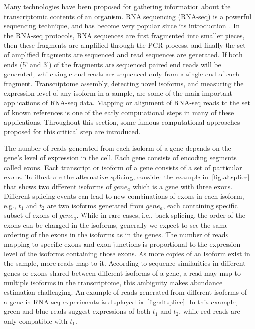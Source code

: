 Many technologies have been proposed for gathering information about 
the transcriptomic contents of an organism. RNA sequencing (RNA-seq) is a 
powerful sequencing technique, and has become very popular since its 
introduction~\citep{mortazavi}. In the RNA-seq protocols, RNA sequences are 
first fragmented into smaller pieces, then these fragments are amplified 
through the PCR process, and finally the set of amplified fragments are 
sequenced and read sequences are generated. If both ends (5' and 3') of the 
fragments are sequenced paired end reads will be generated, while single 
end reads are sequenced only from a single end of each fragment.
Transcriptome assembly, detecting novel isoforms, and measuring the 
expression level of any isoform in a sample, are some of the main 
important applications of RNA-seq data. Mapping or alignment of RNA-seq 
reads to the set of known references is one of the early computational 
steps in many of these applications. Throughout this section, some famous 
computational approaches proposed for this critical step are introduced.


The number of reads generated from each isoform of a gene depends on the 
gene's level of expression in the cell. Each gene consists of encoding 
segments called exons. Each transcript or isoform of a gene consists of 
a set of particular exons. To illustrate the alternative splicing, consider 
the example in~\cref{fig:altsplice} that shows two different isoforms of 
$gene_a$ which is a gene with three exons. Different splicing events can 
lead to new combinations of exons in each isoform, e.g., $t_1$ and $t_2$ 
are two isoforms generated from $gene_a$, each containing specific subset 
of exons of $gene_a$. While in rare cases, i.e., back-splicing, the order
of the exons can be changed in the isoforms, generally we expect to see the same
ordering of the exons in the isoforms as in the genes.
The number of reads mapping to specific exons and exon junctions
is proportional to the expression level of the isoforms containing those exons. 
As more copies of an isoform exist in the sample, more reads map to it.
According to sequence similarities in different genes or exons shared between different 
isoforms of a gene, a read may map to multiple isoforms in the transcriptome, 
this ambiguity makes abundance estimation challenging. An example of reads 
generated from different isoforms of a gene in RNA-seq experiments is displayed 
in~\cref{fig:altsplice}. In this example, green and blue reads suggest 
expressions of both $t_1$ and $t_2$, while red reads are only compatible 
with $t_1$. 

